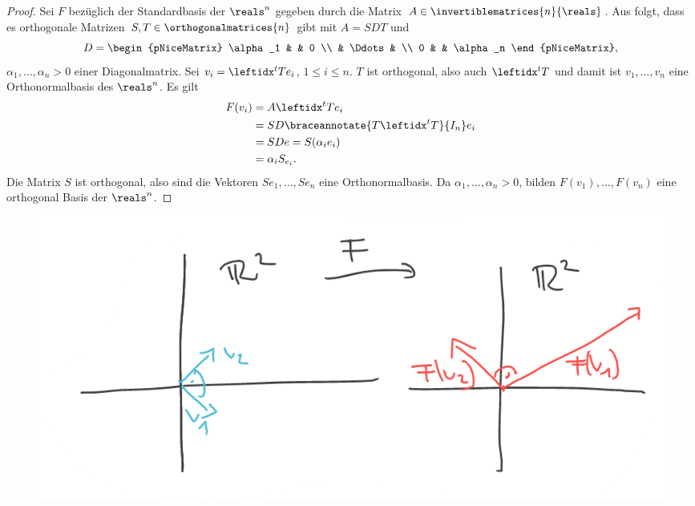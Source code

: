 \begin{proof}
  Sei \( F \) bezüglich der Standardbasis der \( \reals^n \) gegeben durch die Matrix \( A\in \invertiblematrices{n}{\reals} \). Aus  folgt, dass es orthogonale Matrizen \( S,T\in \orthogonalmatrices{n} \) gibt mit \( A=SDT \) und
  \begin{equation*}
    D=\begin{pNiceMatrix}
      \alpha_1 &  & 0 \\
       & \Ddots &  \\
      0 &  & \alpha_n
    \end{pNiceMatrix},
  \end{equation*}
  \( \alpha_1,\dotsc,\alpha_n>0 \) einer Diagonalmatrix. Sei \( v_i=\transpose{T}e_i \), \( 1\leq i\leq n \). \( T \) ist orthogonal, also auch \( \transpose{T} \) und damit ist \( v_1,\dotsc,v_n \) eine Orthonormalbasis des \( \reals^n \). Es gilt
  \begin{align*}
    F(v_i)&=A\transpose{T}e_i\\
    &=SD\braceannotate{T\transpose{T}}{I_n}e_i\\
    &=SDe=S(\alpha_i e_i)\\
    &=\alpha_i S_{e_i}.
  \end{align*}
  Die Matrix \( S \) ist orthogonal, also sind die Vektoren \( Se_1,\dotsc,Se_n \) eine Orthonormalbasis. Da \( \alpha_1,\dotsc,\alpha_n>0 \), bilden \( F(v_1),\dotsc,F(v_n) \) eine orthogonal Basis der \( \reals^n \).
\end{proof}
\begin{beispiel*}
  \phantom{Ein Beispiel}
  \begin{figure}[H]
    \centering
    \includegraphics[width=0.5\linewidth]{figures/orthonormalbasis_auf_orthogonalbasis}
    \label{fig:orthonormalbasis_auf_orthogonalbasis}
  \end{figure}
\end{beispiel*}